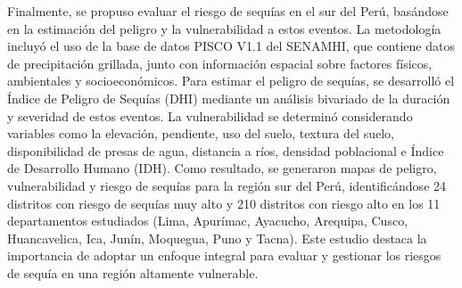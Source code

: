 Finalmente, \textcite{Vega2016} se propuso evaluar el riesgo de sequías en el sur del Perú, basándose en la estimación del peligro y la vulnerabilidad a estos eventos. La metodología incluyó el uso de la base de datos PISCO V1.1 del SENAMHI, que contiene datos de precipitación grillada, junto con información espacial sobre factores físicos, ambientales y socioeconómicos. Para estimar el peligro de sequías, se desarrolló el Índice de Peligro de Sequías (DHI) mediante un análisis bivariado de la duración y severidad de estos eventos. La vulnerabilidad se determinó considerando variables como la elevación, pendiente, uso del suelo, textura del suelo, disponibilidad de presas de agua, distancia a ríos, densidad poblacional e Índice de Desarrollo Humano (IDH). Como resultado, se generaron mapas de peligro, vulnerabilidad y riesgo de sequías para la región sur del Perú, identificándose 24 distritos con riesgo de sequías muy alto y 210 distritos con riesgo alto en los 11 departamentos estudiados (Lima, Apurímac, Ayacucho, Arequipa, Cusco, Huancavelica, Ica, Junín, Moquegua, Puno y Tacna). Este estudio destaca la importancia de adoptar un enfoque integral para evaluar y gestionar los riesgos de sequía en una región altamente vulnerable.



